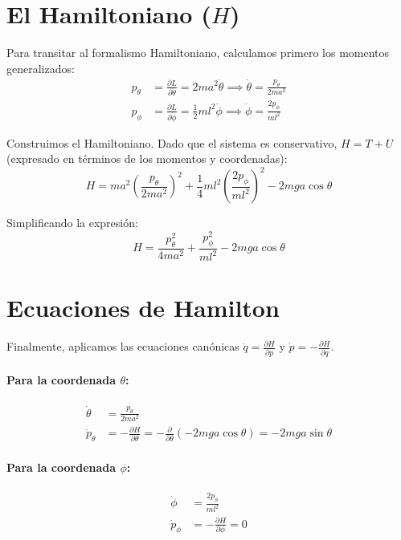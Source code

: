 \documentclass[12pt, a4paper]{article}
\begin{document}
\section*{El Hamiltoniano ($H$)}

Para transitar al formalismo Hamiltoniano, calculamos primero los momentos generalizados:
\begin{align}
    p_\theta &= \frac{\partial L}{\partial \dot{\theta}} = 2 m a^2 \dot{\theta} \implies \dot{\theta} = \frac{p_\theta}{2 m a^2} \\
    p_\phi &= \frac{\partial L}{\partial \dot{\phi}} = \frac{1}{2} m l^2 \dot{\phi} \implies \dot{\phi} = \frac{2 p_\phi}{m l^2}
\end{align}

Construimos el Hamiltoniano. Dado que el sistema es conservativo, $H = T + U$ (expresado en términos de los momentos y coordenadas):
\begin{equation}
    H = m a^2 \left( \frac{p_\theta}{2 m a^2} \right)^2 + \frac{1}{4} m l^2 \left( \frac{2 p_\phi}{m l^2} \right)^2 - 2 m g a \cos \theta
\end{equation}

Simplificando la expresión:
\begin{equation}
    H = \frac{p_\theta^2}{4 m a^2} + \frac{p_\phi^2}{m l^2} - 2 m g a \cos \theta
\end{equation}

\section*{Ecuaciones de Hamilton}

Finalmente, aplicamos las ecuaciones canónicas $\dot{q} = \frac{\partial H}{\partial p}$ y $\dot{p} = -\frac{\partial H}{\partial q}$.

\paragraph{Para la coordenada $\theta$:}
\begin{align}
    \dot{\theta} &= \frac{p_\theta}{2 m a^2} \\
    \dot{p}_\theta &= -\frac{\partial H}{\partial \theta} = -\frac{\partial}{\partial \theta}(-2mga \cos \theta) = -2mga \sin \theta
\end{align}

\paragraph{Para la coordenada $\phi$:}
\begin{align}
    \dot{\phi} &= \frac{2 p_\phi}{m l^2} \\
    \dot{p}_\phi &= -\frac{\partial H}{\partial \phi} = 0
\end{align}
\end{document}

